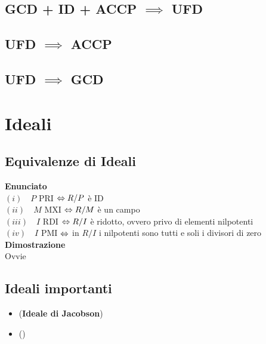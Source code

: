 \documentclass[a4paper,GeneralMath,NoNotes]{stdmdoc}
\newcommand{\Enunciato}{\vskip 0.05cm \noindent \textbf{Enunciato} \\ }
\renewcommand{\Dimostrazione}{\vskip 0.05cm \noindent \textbf{Dimostrazione} \\ }
\begin{document}
	\subsection{GCD + ID + ACCP $\implies$ UFD}

	\subsection{UFD $\implies$ ACCP}

	\subsection{UFD $\implies$ GCD}

	\section*{Ideali}
	\subsection{Equivalenze di Ideali}
	\Enunciato
		$(i) \quad P $ PRI $\Leftrightarrow R/P$ è ID \\
		$(ii) \quad M $ MXI $\Leftrightarrow R/M$ è un campo \\
		$(iii) \quad I $ RDI $\Leftrightarrow R/I$ è ridotto, ovvero privo di elementi nilpotenti \\
		$(iv) \quad I $ PMI $\Leftrightarrow$ in $R/I$ i nilpotenti sono tutti e soli i divisori di zero \\
	\Dimostrazione Ovvie

	\subsection{Ideali importanti}
	\begin{itemize}
		\item ({\bf Ideale di Jacobson})
		\item ({\bf })
	\end{itemize}
\end{document}
